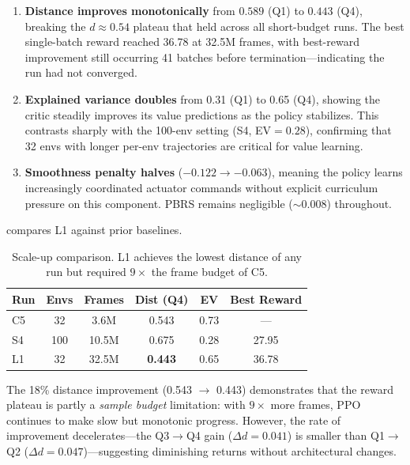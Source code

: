 \documentclass[11pt]{article}
\begin{document}
\begin{enumerate}
  \item \textbf{Distance improves monotonically} from $0.589$ (Q1) to $0.443$ (Q4), breaking the $d{\approx}0.54$ plateau that held across all short-budget runs. The best single-batch reward reached 36.78 at 32.5M frames, with best-reward improvement still occurring 41 batches before termination---indicating the run had not converged.

  \item \textbf{Explained variance doubles} from 0.31 (Q1) to 0.65 (Q4), showing the critic steadily improves its value predictions as the policy stabilizes. This contrasts sharply with the 100-env setting (S4, EV${=}0.28$), confirming that 32 envs with longer per-env trajectories are critical for value learning.

  \item \textbf{Smoothness penalty halves} ($-0.122 \to -0.063$), meaning the policy learns increasingly coordinated actuator commands without explicit curriculum pressure on this component. PBRS remains negligible (${\sim}0.008$) throughout.
\end{enumerate}

\noindent
{} compares L1 against prior baselines.

\begin{table}[H]
  \centering
  \small
  \renewcommand{\arraystretch}{1.3}
  \caption{Scale-up comparison. L1 achieves the lowest distance of any run but required $9\times$ the frame budget of C5.}
  \label{tab:scaleup-comparison}
  \begin{tabular}{@{}lccccc@{}}
    \toprule
    \textbf{Run} & \textbf{Envs} & \textbf{Frames} & \textbf{Dist (Q4)} & \textbf{EV} & \textbf{Best Reward} \\
    \midrule
    C5 & 32 & 3.6M  & 0.543 & 0.73 & --- \\
    S4 & 100 & 10.5M & 0.675 & 0.28 & 27.95 \\
    L1 & 32 & 32.5M & \textbf{0.443} & 0.65 & 36.78 \\
    \bottomrule
  \end{tabular}
\end{table}

\noindent
The 18\% distance improvement (0.543 $\to$ 0.443) demonstrates that the reward plateau is partly a \emph{sample budget} limitation: with $9\times$ more frames, PPO continues to make slow but monotonic progress. However, the rate of improvement decelerates---the Q3$\to$Q4 gain ($\Delta d = 0.041$) is smaller than Q1$\to$Q2 ($\Delta d = 0.047$)---suggesting diminishing returns without architectural changes.
\end{document}
